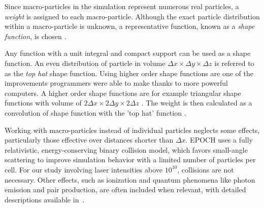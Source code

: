 Since macro-particles in the simulation represent numerous real particles, a \textit{weight} is assigned to each macro-particle. Although the exact particle distribution within a macro-particle is unknown, a representative function, known as a \textit{shape function}, is chosen \cite{arber2015}. 

Any function with a unit integral and compact support can be used as a shape function. An even distribution of particle in volume $\Delta x \times \Delta y \times \Delta z$ is referred to as the \textit{top hat} shape function. Using higher order shape functions are one of the improvements programmers were able to make thanks to more powerful computers. A higher order shape functions are for example triangular shape functions with volume of $2\Delta x \times 2\Delta y \times 2\Delta z$  . The weight is then calculated as a convolution of shape function with the 'top hat' function \cite{arber2015}.

Working with macro-particles instead of individual particles neglects some effects, particularly those effective over distances shorter than $\Delta x$. EPOCH uses a fully relativistic, energy-conserving binary collision model, which favors small-angle scattering to improve simulation behavior with a limited number of particles per cell. For our study involving laser intensities above $10^{10}$, collisions are not necessary. Other effects, such as ionization and quantum phenomena like photon emission and pair production, are often included when relevant, with detailed descriptions available in~\cite{arber2015}.